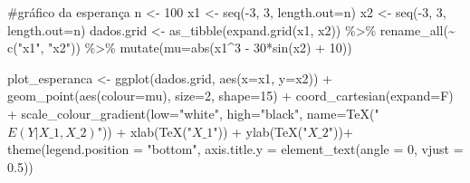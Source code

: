 \documentclass[
  a4paperpaper,
]{article}
\newenvironment{Shaded}{\begin{snugshade}}{\end{snugshade}}
\newcommand{\AttributeTok}[1]{\textcolor[rgb]{0.40,0.45,0.13}{#1}}
\newcommand{\CommentTok}[1]{\textcolor[rgb]{0.37,0.37,0.37}{#1}}
\newcommand{\DecValTok}[1]{\textcolor[rgb]{0.68,0.00,0.00}{#1}}
\newcommand{\FloatTok}[1]{\textcolor[rgb]{0.68,0.00,0.00}{#1}}
\newcommand{\FunctionTok}[1]{\textcolor[rgb]{0.28,0.35,0.67}{#1}}
\newcommand{\NormalTok}[1]{\textcolor[rgb]{0.00,0.23,0.31}{#1}}
\newcommand{\OtherTok}[1]{\textcolor[rgb]{0.00,0.23,0.31}{#1}}
\newcommand{\SpecialCharTok}[1]{\textcolor[rgb]{0.37,0.37,0.37}{#1}}
\newcommand{\StringTok}[1]{\textcolor[rgb]{0.13,0.47,0.30}{#1}}
\begin{document}
\begin{Shaded}
\begin{Highlighting}[]
\CommentTok{\#gráfico da esperança}
\NormalTok{n }\OtherTok{\textless{}{-}} \DecValTok{100}
\NormalTok{x1 }\OtherTok{\textless{}{-}} \FunctionTok{seq}\NormalTok{(}\SpecialCharTok{{-}}\DecValTok{3}\NormalTok{, }\DecValTok{3}\NormalTok{, }\AttributeTok{length.out=}\NormalTok{n)}
\NormalTok{x2 }\OtherTok{\textless{}{-}} \FunctionTok{seq}\NormalTok{(}\SpecialCharTok{{-}}\DecValTok{3}\NormalTok{, }\DecValTok{3}\NormalTok{, }\AttributeTok{length.out=}\NormalTok{n)}
\NormalTok{dados.grid }\OtherTok{\textless{}{-}} \FunctionTok{as\_tibble}\NormalTok{(}\FunctionTok{expand.grid}\NormalTok{(x1, x2)) }\SpecialCharTok{\%\textgreater{}\%}
  \FunctionTok{rename\_all}\NormalTok{(}\SpecialCharTok{\textasciitilde{}} \FunctionTok{c}\NormalTok{(}\StringTok{"x1"}\NormalTok{, }\StringTok{"x2"}\NormalTok{)) }\SpecialCharTok{\%\textgreater{}\%}
  \FunctionTok{mutate}\NormalTok{(}\AttributeTok{mu=}\FunctionTok{abs}\NormalTok{(x1}\SpecialCharTok{\^{}}\DecValTok{3} \SpecialCharTok{{-}} \DecValTok{30}\SpecialCharTok{*}\FunctionTok{sin}\NormalTok{(x2) }\SpecialCharTok{+} \DecValTok{10}\NormalTok{))}

\NormalTok{plot\_esperanca }\OtherTok{\textless{}{-}} \FunctionTok{ggplot}\NormalTok{(dados.grid, }\FunctionTok{aes}\NormalTok{(}\AttributeTok{x=}\NormalTok{x1, }\AttributeTok{y=}\NormalTok{x2)) }\SpecialCharTok{+}
  \FunctionTok{geom\_point}\NormalTok{(}\FunctionTok{aes}\NormalTok{(}\AttributeTok{colour=}\NormalTok{mu), }\AttributeTok{size=}\DecValTok{2}\NormalTok{, }\AttributeTok{shape=}\DecValTok{15}\NormalTok{) }\SpecialCharTok{+}
  \FunctionTok{coord\_cartesian}\NormalTok{(}\AttributeTok{expand=}\NormalTok{F) }\SpecialCharTok{+}
  \FunctionTok{scale\_colour\_gradient}\NormalTok{(}\AttributeTok{low=}\StringTok{"white"}\NormalTok{,}
  \AttributeTok{high=}\StringTok{"black"}\NormalTok{,}
  \AttributeTok{name=}\FunctionTok{TeX}\NormalTok{(}\StringTok{"$E(Y|X\_1, X\_2)$"}\NormalTok{)) }\SpecialCharTok{+}
  \FunctionTok{xlab}\NormalTok{(}\FunctionTok{TeX}\NormalTok{(}\StringTok{"$X\_1$"}\NormalTok{)) }\SpecialCharTok{+} \FunctionTok{ylab}\NormalTok{(}\FunctionTok{TeX}\NormalTok{(}\StringTok{"$X\_2$"}\NormalTok{))}\SpecialCharTok{+}
  \FunctionTok{theme}\NormalTok{(}\AttributeTok{legend.position =} \StringTok{"bottom"}\NormalTok{,}
        \AttributeTok{axis.title.y =} \FunctionTok{element\_text}\NormalTok{(}\AttributeTok{angle =} \DecValTok{0}\NormalTok{, }\AttributeTok{vjust =} \FloatTok{0.5}\NormalTok{))}
\end{Highlighting}
\end{Shaded}
\end{document}

